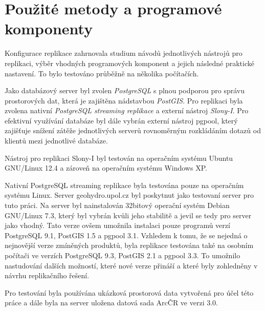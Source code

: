 \section{Použité metody a programové komponenty}
Konfigurace replikace zahrnovala studium návodů jednotlivých nástrojů pro
replikaci, výběr vhodných programových komponent a jejich následné praktické
nastavení. To bylo testováno průběžně na několika počítačích. 

Jako databázový server byl zvolen {\it PostgreSQL} s plnou podporou pro správu
prostorových dat, která je zajištěna nádstavbou {\it PostGIS}. Pro replikaci byla
zvolena nativní {\it PostgreSQL streaming replikace} a externí nástroj {\it Slony-I}. Pro
efektivní využívání databáze byl dále vybrán externí nástroj pgpool, který
zajišťuje snížení zátěže jednotlivých serverů rovnoměrným rozkládáním dotazů od
klientů mezi jednotlivé databáze. 

Nástroj pro replikaci Slony-I byl testován na operačním systému Ubuntu
GNU/Li\-nux 12.4 a zároveň na operačním systému Windows XP. 

Nativní PostgreSQL streaming replikace byla testována pouze na operačním
systému Linux. Server geohydro.upol.cz byl poskytnut jako testovaní server pro
tuto práci. Na server byl nainstalován 32bitový operační systém Debian
GNU/Li\-nux 7.3, který byl vybrán kvůli jeho stabilitě a jevil se tedy pro server
jako vhodný. Tato verze ovšem umožnila instalaci pouze programů verzí
PostgreSQL 9.1, PostGIS 1.5 a pgpool 3.1. Vzhledem k tomu, že se nejedná o
nejnovější verze zmíněných produktů, byla replikace testována také na osobním
počítači ve verzích PostgreSQL 9.3, PostGIS 2.1 a pgpool 3.3. To umožnilo
nastudování dalších možností, které nové verze přináší a které byly zohledněny
v návrhu replikačního řešení. 

Pro testování byla používána ukázková prostorová data vytvořená pro účel této
práce a dále byla na server uložena datová sada ArcČR ve verzi 3.0.


